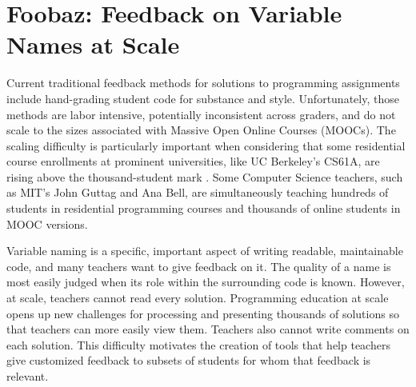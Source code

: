 \chapter{Foobaz: Feedback on Variable Names at Scale}\label{chapter:foobaz}



Current traditional feedback methods for solutions to programming assignments include hand-grading student code for substance and style. Unfortunately, those methods are labor intensive, potentially inconsistent across graders, and do not scale to the sizes associated with Massive Open Online Courses (MOOCs). The scaling difficulty is particularly important when considering that  some residential course enrollments at prominent universities, like UC Berkeley's CS61A, are rising above the thousand-student mark \cite{biggestClass}. Some Computer Science teachers, such as MIT's John Guttag and Ana Bell, are simultaneously teaching hundreds of students in residential programming courses and thousands of online students in MOOC versions.

Variable naming is a specific, important aspect of writing readable, maintainable code, and many teachers want to give feedback on it. The quality of a name is most easily judged when its role within the surrounding code is known. However, at scale, teachers cannot read every solution. Programming education at scale opens up new challenges for processing and presenting thousands of solutions so that teachers can more easily view them. Teachers also cannot write comments on each solution. This difficulty motivates the creation of tools that help teachers give customized feedback to subsets of students for whom that feedback is relevant.

